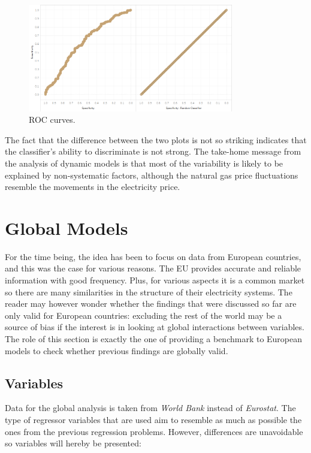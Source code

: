 \documentclass[a4paper,12pt]{book}
\begin{document}
\begin{figure}[tb]
\begin{center}
\captionsetup{justification=centering}
\includegraphics[width=0.8\textwidth]{Images/ROc.png}
\caption{ROC curves.}
\label{fig:roc}
\end{center}
\end{figure}

The fact that the difference between the two plots is not so striking indicates that the classifier's ability to discriminate is not strong. The take-home message from the analysis of dynamic models is that most of the variability is likely to be explained by non-systematic factors, although the natural gas price fluctuations resemble the movements in the electricity price.

\section{Global Models}

For the time being, the idea has been to focus on data from European countries, and this was the case for various reasons. The EU provides accurate and reliable information with good frequency. Plus, for various aspects it is a common market so there are many similarities in the structure of their electricity systems. The reader may however wonder whether the findings that were discussed so far are only valid for European countries: excluding the rest of the world may be a source of bias if the interest is in looking at global interactions between variables. The role of this section is exactly the one of providing a benchmark to European models to check whether previous findings are globally valid.

\subsection{Variables}

Data for the global analysis is taken from \textit{World Bank} instead of \textit{Eurostat}. The type of regressor variables that are used aim to resemble as much as possible the ones from the previous regression problems. However, differences are unavoidable so variables will hereby be presented:
\end{document}
